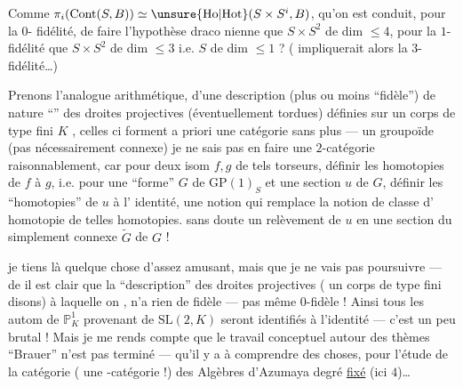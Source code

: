 Comme $\pi_i(\mathrm{Cont}(S,B))\simeq
\unsure{\mathrm{Ho}|\mathrm{Hot}}(S\times S^i,B)$,
 
qu'on est conduit, pour la $0$-%
fidélité, de faire l'hypothèse draco%
nienne que $S\times S^2$ de dim $\leq4$, pour la
$1$-fidélité que $S\times S^2$ de dim $\leq3$ i.e. $S$
de dim $\leq1$ ? ( impliquerait alors
la $3$-fidélité\ldots)

Prenons l'analogue arithmétique, d'une description
(plus ou moins ``fidèle'') 
de nature ``''
des droites projectives  (éventuellement
tordues) définies sur un corps de type
fini $K$ ,
celles ci forment a priori une catégorie
sans plus --- un groupoïde (pas nécessairement
connexe) je ne sais pas en faire une
$2$-catégorie raisonnablement, car pour deux
isom $f,g$  de tels torseurs, définir les
homotopies de $f$ à $g$, i.e. pour une ``forme''
$G$ de $\mathrm{GP}(1)_S$ et une section $u$ de $G$,
définir les ``homotopies'' de $u$ à l'%
identité, 
 une
notion qui remplace la notion de classe d'%
homotopie de telles homotopies.  
sans doute un relèvement de $u$ en une
section du 
 simplement
connexe $\widetilde G$ de $G$ !

je tiens là quelque chose d'assez amusant,
mais que je ne vais pas poursuivre --- de
 il est clair que la ``description''
des droites projectives ( un corps de
type fini disons) à laquelle on ,
n'a rien de fidèle --- pas même $0$-fidèle !
Ainsi tous les autom de $\mathbb P^1_K$ provenant de
$\mathrm{SL}(2,K)$ seront identifiés à l'identité ---
c'est un peu brutal ! Mais je me
rends compte que le travail conceptuel
autour des thèmes ``Brauer'' n'est pas
terminé --- qu'il y a à comprendre
des choses, pour l'étude de la catégorie
( une -catégorie !)
des Algèbres d'Azumaya
 degré \uline{fixé} (ici $4$)\ldots
{}
